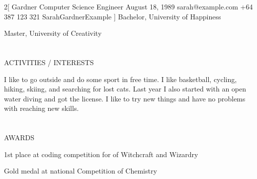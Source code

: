 \documentclass{my_cv}
\begin{document}
\begin{multicols}{2}[
        {Gardner}%
        {Computer Science Engineer}%
        {August 18, 1989}%
        {sarah@example.com}%
        {+64 387 123 321}%
        {SarahGardnerExample}
]
%
    {Bachelor, University of Happiness}
    
%
    {Master, University of Creativity}

\section{\faSoccerBallO}{ACTIVITIES / INTERESTS}

I like to go outside and do some sport in free
time. I like basketball, cycling, hiking, skiing, and searching for lost cats. Last year I also started with an open water diving and got the license. I like to try new things and have no problems with reaching new skills.

\section{\faBook}{AWARDS}

%
    {1st place at coding competition for of Witchcraft and Wizardry}
     

%
    {Gold medal at national Competition of Chemistry}


\end{multicols}
\end{document}
